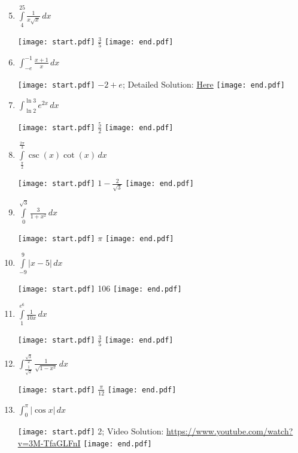\documentclass[12pt]{article}
\begin{document}
\begin{enumerate}
\setcounter{enumi}{4}

\item $\int\limits_{4}^{25} \frac{1}{x\sqrt{x}}\,dx$ 

\texttt{[image: start.pdf]}
{{$\frac{3}{5}$}}
\texttt{[image: end.pdf]}


\item $\int_{-e}^{-1}{\frac{x+1}{x}} \,dx$

\texttt{[image: start.pdf]}
{{$-2+e$; Detailed Solution: \textcolor{blue}{\href{http://www.math.drexel.edu/classes/Calculus/resources/Math122HW/Solutions/122_04_FTC_06.pdf}{Here}}}}
\texttt{[image: end.pdf]}


\item $\int_{\ln{2}}^{\ln{3}}e^{2x} \,dx$

\texttt{[image: start.pdf]}
{{$\frac{5}{2}$}}
\texttt{[image: end.pdf]}


\item $\int\limits_{\frac{\pi}{2}}^{\frac{2\pi}{3}}\csc{(x)}\cot{(x)}\,dx$ 

\texttt{[image: start.pdf]}
{{$1-\frac{2}{\sqrt{3}}$}}
\texttt{[image: end.pdf]}


\item $\int\limits_{0}^{\sqrt{3}}\frac{3}{1+x^2}\,dx$ 

\texttt{[image: start.pdf]}
{{$\pi$}}
\texttt{[image: end.pdf]}


\item $\int\limits_{-9}^{9}|x-5|\,dx$ 

\texttt{[image: start.pdf]}
{{106}}
\texttt{[image: end.pdf]}


\item $\int\limits^{e^{6}}_{1}\frac{1}{10 x}\,dx$ 

\texttt{[image: start.pdf]}
{{$\frac{3}{5}$}}
\texttt{[image: end.pdf]}


\item $\int_{\frac{1}{\sqrt{2}}}^{\frac{\sqrt{3}}{2}} \frac{1}{\sqrt{1-x^2}} \,dx$ 

\texttt{[image: start.pdf]}
{{$\frac{\pi}{12}$}}
\texttt{[image: end.pdf]}


\item $\int_{0}^{\pi} |\cos{x}| \,dx$

\texttt{[image: start.pdf]}
{{2; Video Solution: \textcolor{blue}{\href{https://www.youtube.com/watch?v=3M-TfaGLFnI}{https://www.youtube.com/watch?v=3M-TfaGLFnI}}}}
\texttt{[image: end.pdf]}



\end{enumerate}
\end{document}
